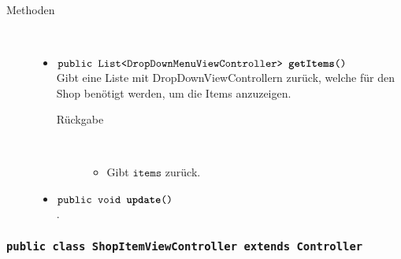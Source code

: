 \begin{description}
\begin{itemize}
	\end{itemize}
	
\item[Methoden] \hfill \\
	\vspace{-.8cm}
	\begin{itemize}
		\item $\texttt{public List<DropDownMenuViewController> \textbf{getItems}()}$ \\ Gibt eine Liste mit DropDownViewControllern zurück, welche für den Shop benötigt werden, um die Items anzuzeigen.
		\begin{description}
			\item[Rückgabe] \hfill \\
			\vspace{-.8cm}
			\begin{itemize}
				\item Gibt $\texttt{items}$ zurück.
			\end{itemize}
			\end{description}
		
		\item $\texttt{public void \textbf{update}()}$ \\.


		\end{itemize}
	\end{description}
	
	
\subsubsection{\normalfont \texttt{public class \textbf{ShopItemViewController} extends Controller}}


